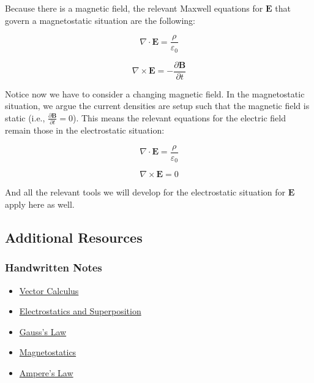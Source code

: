 Because there is a magnetic field, the relevant Maxwell equations for
\(\mathbf{E}\) that govern a magnetostatic situation are the following:

\[\nabla \cdot \mathbf{E} = \frac{\rho}{\varepsilon_0}\]

\[\nabla \times \mathbf{E} = -\frac{\partial \mathbf{B}}{\partial t}\]

Notice now we have to consider a changing magnetic field. In the
magnetostatic situation, we argue the current densities are setup such
that the magnetic field is static (i.e.,
\(\frac{\partial \mathbf{B}}{\partial t} = 0\)). This means the relevant
equations for the electric field remain those in the electrostatic
situation:

\[\nabla \cdot \mathbf{E} = \frac{\rho}{\varepsilon_0}\]

\[\nabla \times \mathbf{E} = 0\]

And all the relevant tools we will develop for the electrostatic
situation for \(\mathbf{E}\) apply here as well.

\subsection{Additional Resources}\label{additional-resources}

\subsubsection{Handwritten Notes}\label{handwritten-notes}

\begin{itemize}
\tightlist
\item
  \href{../../assets/notes/Notes-Vector_Calculus.pdf}{Vector Calculus}
\item
  \href{../../assets/notes/Notes-Electrostatics_and_Superposition.pdf}{Electrostatics
  and Superposition}
\item
  \href{../../assets/notes/Notes-Gauss_Law.pdf}{Gauss's Law}
\item
  \href{../../assets/notes/Notes-Magnetostatics.pdf}{Magnetostatics}
\item
  \href{../../assets/notes/Notes-Amperes_Law.pdf}{Ampere's Law}
\end{itemize}
